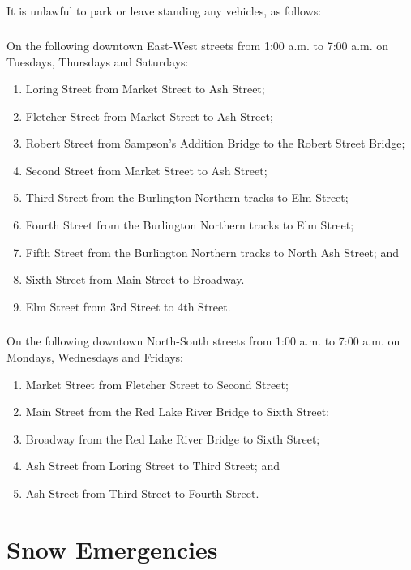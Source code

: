 \subsection{}
It is unlawful to park or leave standing any vehicles, as follows:
\subsubsection{}
On the following downtown East-West streets from 1:00 a.m. to 7:00 a.m. on Tuesdays, Thursdays and Saturdays:
\begin{enumerate}[{\indent}a)]
\item Loring Street from Market Street to Ash Street;
\item Fletcher Street from Market Street to Ash Street;
\item Robert Street from Sampson’s Addition Bridge to the Robert Street Bridge;
\item Second Street from Market Street to Ash Street;
\item Third Street from the Burlington Northern tracks to Elm Street;
\item Fourth Street from the Burlington Northern tracks to Elm Street;
\item Fifth Street from the Burlington Northern tracks to North Ash Street; and
\item Sixth Street from Main Street to Broadway.
\item Elm Street from 3rd Street to 4th Street.
\end{enumerate}
\subsubsection{}
On the following downtown North-South streets from 1:00 a.m. to 7:00 a.m. on Mondays, Wednesdays and Fridays:
\begin{enumerate}[{\indent}a)]
\item Market Street from Fletcher Street to Second Street;
\item Main Street from the Red Lake River Bridge to Sixth Street;
\item Broadway from the Red Lake River Bridge to Sixth Street;
\item Ash Street from Loring Street to Third Street; and
\item Ash Street from Third Street to Fourth Street.
\end{enumerate}

\section{Snow Emergencies}
